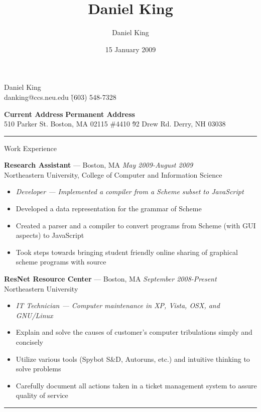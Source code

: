 \documentclass[10pt]{letter}
\author{Daniel King}
\title{Daniel King}
\date{15 January 2009}
\begin{document}
\begin{tabbing}{\Huge Daniel King} \\
\normalsize danking@ccs.neu.edu \`(603) 548-7328
\end{tabbing}

\vspace{-10pt}
\begin{tabbing}
\textbf{Current Address} \`\textbf{Permanent Address}\\
510 Parker St. Boston, MA 02115 \#4410 \`92 Drew Rd. Derry, NH 03038
\end{tabbing}\vspace{-15pt}
\rule{\linewidth}{.5pt}

{\Large Work Experience}
\begin{tabbing}
{\large \bf Research Assistant} --- Boston, MA \` \textit{May 2009-August 2009} \\
Northeastern University, College of Computer and Information Science
\end{tabbing}\vspace{-10pt}
\begin{itemize}
\setlength\itemsep{1pt}
\item [] \textit{Developer --- Implemented a compiler from a Scheme subset to JavaScript}
\item Developed a data representation for the grammar of Scheme
\item Created a parser and a compiler to convert programs from Scheme (with GUI aspects) to JavaScript
\item Took steps towards bringing student friendly online sharing of graphical scheme programs with source
\end{itemize}

\begin{tabbing}
{\large \bf ResNet Resource Center} --- Boston, MA \` \textit{September 2008-Present} \\
Northeastern University
\end{tabbing}\vspace{-10pt}

\begin{itemize}
\setlength\itemsep{1pt}
\item [] \textit{IT Technician --- Computer maintenance in XP, Vista, OSX, and GNU/Linux}
\item Explain and solve the causes of customer's computer tribulations simply and concisely
\item Utilize various tools (Spybot S\&D, Autoruns, etc.) and intuitive thinking to solve problems
\item Carefully document all actions taken in a ticket management system to assure quality of service
\end{itemize}
\rule{\linewidth}{.5pt}
\end{document}
